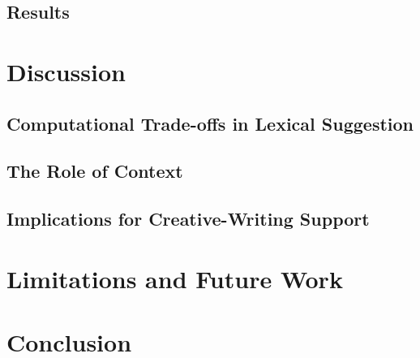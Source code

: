 \documentclass[sigconf,nonacm]{acmart}
\begin{document}
\subsection{Results}


\section{Discussion}

\subsection{Computational Trade-offs in Lexical Suggestion}

\subsection{The Role of Context}

\subsection{Implications for Creative-Writing Support}


\section{Limitations and Future Work}

\section{Conclusion}



\end{document}
